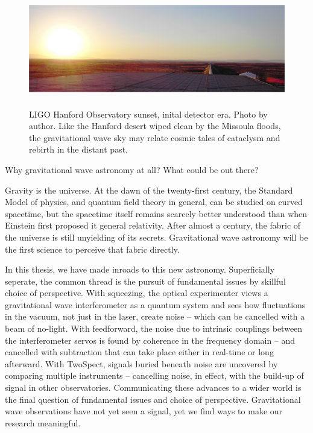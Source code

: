 \begin{figure}
\begin{center}
\includegraphics[height=50mm,width=148mm]{LIGOpanoramasmall.eps}
\caption{LIGO Hanford Observatory sunset, inital detector era. Photo by author. Like the Hanford desert wiped clean by the Missoula floods, the gravitational wave sky may relate cosmic tales of cataclysm and rebirth in the distant past.}
\label{LIGO_panorama_small}
\end{center}
\end{figure}

        Why gravitational wave astronomy at all? What could be out there?

        Gravity is the universe. At the dawn of the twenty-first century, the Standard Model of physics, and quantum field theory in general, can be studied on curved spacetime, but the spacetime itself remains scarcely better understood than when Einstein first proposed it general relativity. 
After almost a century, the fabric of the universe is still unyielding of its secrets. 
Gravitational wave astronomy will be the first science to perceive that fabric directly. 

        In this thesis, we have made inroads to this new astronomy. Superficially seperate, the common thread is the pursuit of fundamental issues by skillful choice of perspective. 
With squeezing, the optical experimenter views a gravitational wave interferometer as a quantum system and sees how fluctuations in the vacuum, not just in the laser, create noise -- which can be cancelled with a beam of no-light.
With feedforward, the noise due to intrinsic couplings between the interferometer servos is found by coherence in the frequency domain -- and cancelled with subtraction that can take place either in real-time or long afterward.
With TwoSpect, signals buried beneath noise are uncovered by comparing multiple instruments -- cancelling noise, in effect, with the build-up of signal in other observatories.
Communicating these advances to a wider world is the final question of fundamental issues and choice of perspective.
Gravitational wave observations have not yet seen a signal, yet we find ways to make our research meaningful.

